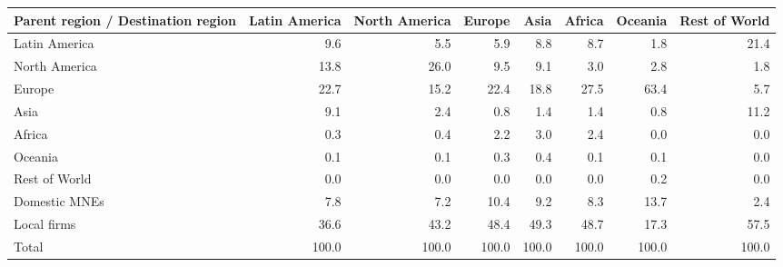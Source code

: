 \begin{tabular}{lrrrrrrr}
\toprule
Parent region / Destination region & Latin America & North America & Europe & Asia & Africa & Oceania & Rest of World \\
\midrule
Latin America & 9.6 & 5.5 & 5.9 & 8.8 & 8.7 & 1.8 & 21.4 \\
North America & 13.8 & 26.0 & 9.5 & 9.1 & 3.0 & 2.8 & 1.8 \\
Europe & 22.7 & 15.2 & 22.4 & 18.8 & 27.5 & 63.4 & 5.7 \\
Asia & 9.1 & 2.4 & 0.8 & 1.4 & 1.4 & 0.8 & 11.2 \\
Africa & 0.3 & 0.4 & 2.2 & 3.0 & 2.4 & 0.0 & 0.0 \\
Oceania & 0.1 & 0.1 & 0.3 & 0.4 & 0.1 & 0.1 & 0.0 \\
Rest of World & 0.0 & 0.0 & 0.0 & 0.0 & 0.0 & 0.2 & 0.0 \\
Domestic MNEs & 7.8 & 7.2 & 10.4 & 9.2 & 8.3 & 13.7 & 2.4 \\
Local firms & 36.6 & 43.2 & 48.4 & 49.3 & 48.7 & 17.3 & 57.5 \\
\midrule
Total & 100.0 & 100.0 & 100.0 & 100.0 & 100.0 & 100.0 & 100.0 \\
\bottomrule
\end{tabular}
